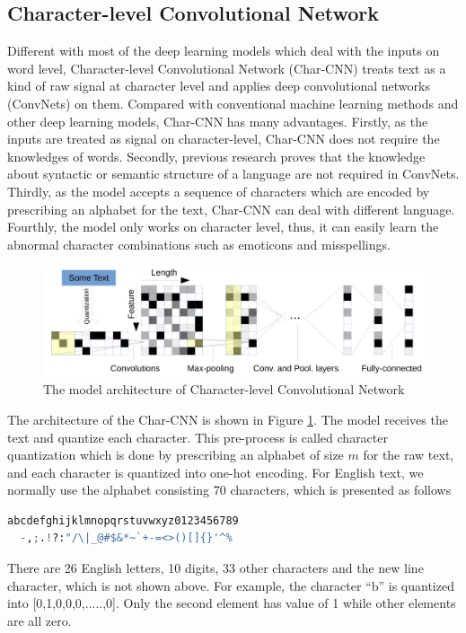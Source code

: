 \subsection{Character-level Convolutional Network}
Different with most of the deep learning models which deal with the inputs on word level, Character-level Convolutional Network (Char-CNN) treats text as a kind of raw signal at character level and applies deep convolutional networks (ConvNets) on them. Compared with conventional machine learning methods and other deep learning models, Char-CNN has many advantages. Firstly, as the inputs are treated as signal on character-level, 
Char-CNN does not require the knowledges of words. Secondly, previous research proves that the knowledge about syntactic or semantic structure of a language are not required in ConvNets. Thirdly, as the model accepts a sequence of characters which are encoded by prescribing an alphabet for the text, Char-CNN can deal with different language. Fourthly, the model only works on character level, thus, it can easily learn the abnormal character combinations such as emoticons and misspellings.

\begin{figure}
\centering
\caption{The model architecture of Character-level Convolutional Network~\cite{zhang2015character}}
\label{char_cnn}
\includegraphics{char_cnn.png}
\end{figure}

The architecture of the Char-CNN is shown in Figure \ref{char_cnn}. The model receives the text and quantize each character. This pre-process is called character quantization which is done by prescribing an alphabet of size $m$ for the raw text, and each character is quantized into one-hot encoding. For English text, we normally use the alphabet consisting 70 characters, which is presented as follows
\begin{lstlisting}[language=Python]
  abcdefghijklmnopqrstuvwxyz0123456789
  -,;.!?:"/\|_@#$&*~`+-=<>()[]{}'^%
\end{lstlisting}
There are 26 English letters, 10 digits, 33 other characters and the new line character, which is not shown above. For example, the character ``b'' is quantized into [0,1,0,0,0,.....,0]. Only the second element has value of 1 while other elements are all zero. 

